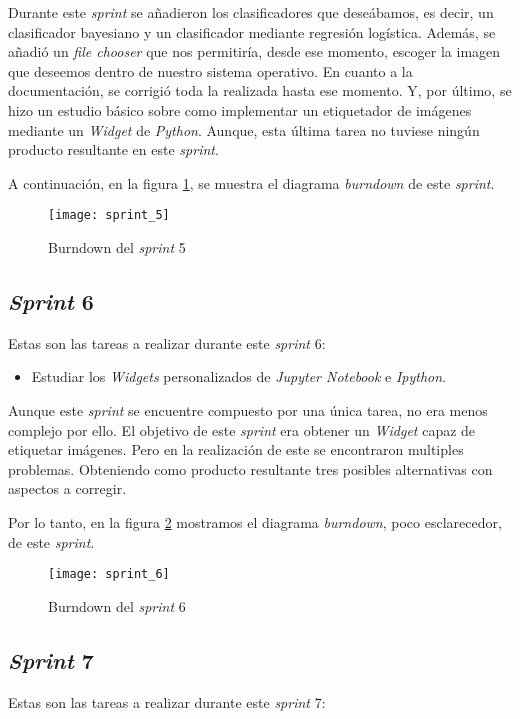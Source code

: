Durante este \textit{sprint} se añadieron los clasificadores que deseábamos, es decir, un clasificador bayesiano y un clasificador mediante regresión logística. Además, se añadió un \textit{file chooser} que nos permitiría, desde ese momento, escoger la imagen que deseemos dentro de nuestro sistema operativo. En cuanto a la documentación, se corrigió toda la  realizada hasta ese momento. Y, por último, se hizo un estudio básico sobre como implementar un etiquetador de imágenes mediante un \textit{Widget} de \textit{Python}. Aunque, esta última tarea no tuviese ningún producto resultante en este \textit{sprint}.

A continuación, en la figura \ref{fig:A.1.6}, se muestra el diagrama \textit{burndown} de este \textit{sprint}.

\begin{figure}[h]
\centering
\texttt{[image: sprint\_5]}
\caption{Burndown del \textit{sprint} 5}
\label{fig:A.1.6}
\end{figure}

\subsection{\textit{Sprint} 6}
Estas son las tareas a realizar durante este \textit{sprint} 6:

\begin{itemize}
	\item Estudiar los \textit{Widgets} personalizados de \textit{Jupyter Notebook} e \textit{Ipython}.
\end{itemize}

Aunque este \textit{sprint} se encuentre compuesto por una única tarea, no era menos complejo por ello. El objetivo de este \textit{sprint} era obtener un \textit{Widget} capaz de etiquetar imágenes. Pero en la realización de este se encontraron multiples problemas. Obteniendo como producto resultante tres posibles alternativas con aspectos a corregir.

Por lo tanto, en la figura \ref{fig:A.1.7} mostramos el diagrama \textit{burndown}, poco esclarecedor, de este \textit{sprint}.

\begin{figure}[h]
\centering
\texttt{[image: sprint\_6]}
\caption{Burndown del \textit{sprint} 6}
\label{fig:A.1.7}
\end{figure}



\subsection{\textit{Sprint} 7}
Estas son las tareas a realizar durante este \textit{sprint} 7:

